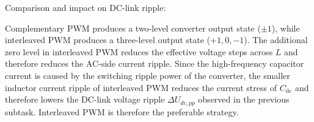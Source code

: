 \begin{solutionblock}
    
    

    Comparison and impact on DC-link ripple:

    Complementary PWM produces a two-level converter output state ($\pm1$), while interleaved PWM produces a three-level output state ($+1,0,-1$).
    The additional zero level in interleaved PWM reduces the effective voltage steps across $L$ and therefore reduces the AC-side current ripple.
    Since the high-frequency capacitor current is caused by the switching ripple power of the converter,
    the smaller inductor current ripple of interleaved PWM reduces the current stress of $C_{\mathrm{dc}}$
    and therefore lowers the DC-link voltage ripple $\Delta U_{dc,pp}$ observed in the previous subtask.
    Interleaved PWM is therefore the preferable strategy.
    \vfill
\end{solutionblock}
